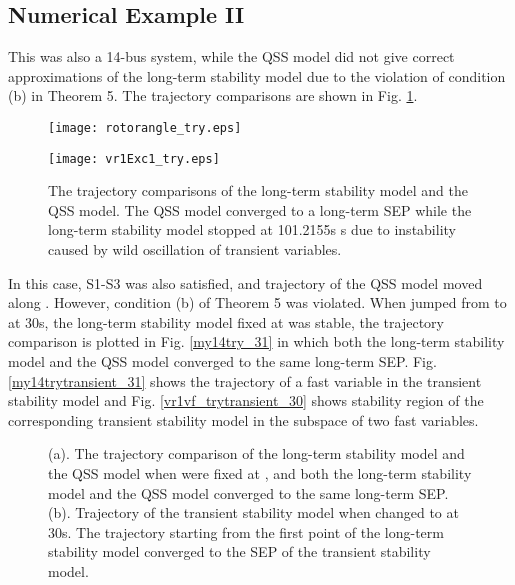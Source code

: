 \documentclass[journal]{IEEEtran}
\begin{document}
\subsection{Numerical Example II}
This was also a 14-bus system, while the QSS model did not give correct approximations of the long-term stability model due to the violation of condition (b) in Theorem 5. The trajectory comparisons are shown in Fig. \ref{my14completeqss_try}.

\begin{figure}[!ht]
\centering
\begin{minipage}[t]{0.5\linewidth}
\texttt{[image: rotorangle\_try.eps]}
\end{minipage}\begin{minipage}[t]{0.5\linewidth}
\texttt{[image: vr1Exc1\_try.eps]}
\end{minipage}
\caption{The trajectory comparisons of the long-term stability model and the QSS model. The QSS model converged to a long-term SEP while the long-term stability model stopped at 101.2155s s due to instability caused by wild oscillation of transient variables.}\label{my14completeqss_try}
\end{figure}

In this case, S1-S3 was also satisfied, and trajectory  of the QSS model moved along . However, condition (b) of Theorem 5 was violated. When  jumped from  to  at 30s, the long-term stability model fixed at  was stable, the trajectory comparison is plotted in Fig. \ref{my14try_31} in which both the long-term stability model and the QSS model converged to the same long-term SEP. Fig. \ref{my14trytransient_31} shows the trajectory of a fast variable in the transient stability model and Fig. \ref{vr1vf_trytransient_30} shows stability region of the corresponding transient stability model in the subspace of two fast variables.

\begin{figure}\centering
{}
\caption{(a). The trajectory comparison of the long-term stability model and the QSS model when  were fixed at , and both the long-term stability model and the QSS model converged to the same long-term SEP. (b). Trajectory of the transient stability model when  changed to  at 30s. The trajectory starting from the first point of the long-term stability model converged to the SEP of the transient stability model.}
\end{figure}
\end{document}
